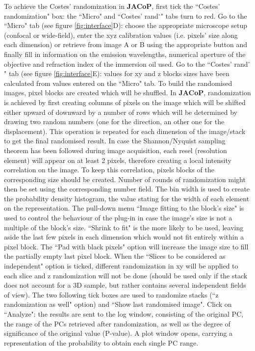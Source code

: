 \documentclass[]{spie}  %
\begin{document}
To achieve the Costes' randomization in \textbf{JACoP}, first tick the ``Costes' randomization" box: the ``Micro" and ``Costes' rand$^\circ$" tabs turn to red. Go to the ``Micro" tab (see figure \ref{fig:interface}D): choose the appropriate microscope setup (confocal or wide-field), enter the xyz calibration values (i.e. pixels' size along each dimension) or retrieve from image A or B using the appropriate button and finally fill in information on the emission wavelengths, numerical aperture of the objective and refraction index of the immersion oil used. Go to the ``Costes' rand$^\circ$" tab (see figure \ref{fig:interface}E): values for xy and z blocks sizes have been calculated from values entered on the ``Micro" tab. To build the randomised images, pixel blocks are created which will be shuffled. In \textbf{JACoP}, randomization is achieved by first creating columns of pixels on the image which will be shifted either upward of downward by a number of rows which will be determined by drawing two random numbers (one for the direction, an other one for the displacement). This operation is repeated for each dimension of the image/stack to get the final randomised result. In case the Shannon/Nyquist sampling theorem has been followed during image acquisition, each resel (resolution element) will appear on at least 2 pixels, therefore creating a local intensity correlation on the image. To keep this correlation, pixels blocks of the corresponding size should be created. Number of rounds of randomization might then be set using the corresponding number field. The bin width is used to create the probability density histogram, the value stating for the width of each element on the representation. The pull-down menu ``Image fitting to the block's size" is used to control the behaviour of the plug-in in case the image's size is not a multiple of the block's size. ``Shrink to fit" is the more likely to be used, leaving aside the last few pixels in each dimension which would not fit entirely within a pixel block. The ``Pad with black pixels" option will increase the image size to fill the partially empty last pixel block. When the ``Slices to be considered as independent" option is ticked, different randomization in xy will be applied to each slice and z randomization will not be done (should be used only if the stack does not account for a 3D sample, but rather contains several independent fields of view). The two following tick boxes are used to randomize stacks (``z randomization as well" option) and ``Show last randomised image". Click on ``Analyze": the results are sent to the log window, consisting of the original PC, the range of the PCs retrieved after randomization, as well as the degree of significance of the original value (P-value). A plot window opens, carrying a representation of the probability to obtain each single PC range.\\
\end{document}

